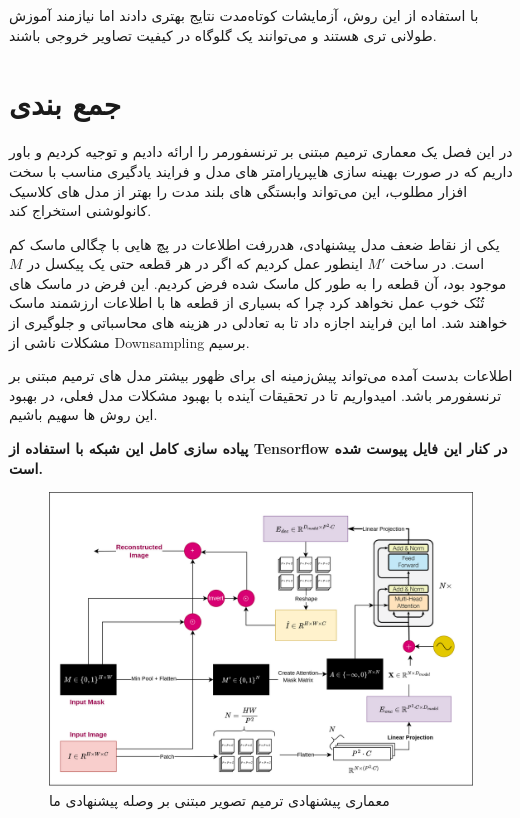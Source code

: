 با استفاده از این روش، آزمایشات کوتاه‌مدت نتایج بهتری دادند اما نیازمند آموزش طولانی تری هستند و می‌توانند یک گلوگاه در کیفیت تصاویر خروجی باشند.

\section{جمع بندی}
در این فصل یک معماری ترمیم مبتنی بر ترنسفورمر را ارائه دادیم و توجیه کردیم و باور داریم که در صورت بهینه سازی هایپرپارامتر های مدل و فرایند یادگیری مناسب با سخت افزار مطلوب، این می‌تواند وابستگی های بلند مدت را بهتر از مدل های کلاسیک کانولوشنی استخراج کند.

یکی از نقاط ضعف مدل پیشنهادی، هدررفت اطلاعات در پچ هایی با چگالی ماسک کم است. در ساخت $M'$ اینطور عمل کردیم که اگر در هر قطعه حتی یک پیکسل در $M$ موجود بود، آن قطعه را به طور کل ماسک شده فرض کردیم. این فرض در ماسک های تُنُک خوب عمل نخواهد کرد چرا که بسیاری از قطعه ها با اطلاعات ارزشمند ماسک خواهند شد. اما این فرایند اجازه داد تا به تعادلی در هزینه های محاسباتی و جلوگیری از مشکلات ناشی از Downsampling برسیم.

اطلاعات بدست آمده می‌تواند پیش‌زمینه ای برای ظهور بیشتر مدل های ترمیم مبتنی بر ترنسفورمر  باشد. امیدواریم تا در تحقیقات آینده با بهبود مشکلات مدل فعلی، در بهبود این روش ها سهیم باشیم.

\textbf{پیاده سازی کامل این شبکه با استفاده از Tensorflow در کنار این فایل پیوست شده است.}


\begin{figure}
	\centering
	\includegraphics[width=1\linewidth]{ourarch1}
	\caption{معماری پیشنهادی ترمیم تصویر مبتنی بر وصله پیشنهادی ما}
	\label{fig:ourarch1}
\end{figure}